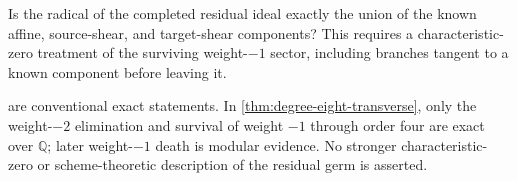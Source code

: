 \begin{question}
Is the radical of the completed residual ideal exactly the union of the
known affine, source-shear, and target-shear components?  This requires a
characteristic-zero treatment of the surviving weight-\(-1\) sector,
including branches tangent to a known component before leaving it.
\end{question}

\begin{remark}[Scope]
 are conventional exact
statements.  In \cref{thm:degree-eight-transverse}, only the weight-\(-2\)
elimination and survival of weight \(-1\) through order four are exact over
\(\mathbb Q\); later weight-\(-1\) death is modular evidence.  No stronger
characteristic-zero or scheme-theoretic description of the residual germ is
asserted.
\end{remark}
